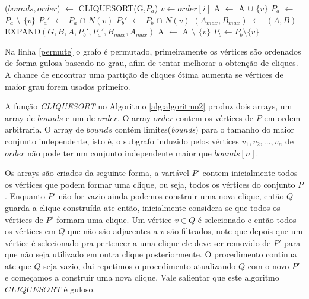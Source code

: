 \begin{algorithm}[]
\begin{algorithmic}[1]
                    \State ($bounds,order$) $\gets$ CLIQUESORT(G,$P_a$)
                            \State $v \gets order[i]$
                            \State A $\gets$ A $\cup$ $\{v\}$
                            \State $P_a$ $\gets$ $P_a$ $\setminus$ $\{v\}$
                            \State $P_a'$ $\gets$ $P_a$ $\cap$ $\overline{N(v)}$
                            \State $P_b'$ $\gets$ $P_b$ $\cap$ $N(v)$
                                \State $(A_{max}, B_{max})$ $\gets$ $(A,B)$
                            \EndIf
                                \State EXPAND$(G,B,A,P_b',P_a',B_{max},A_{max})$
                            \EndIf
                            \State A $\gets$ A $\setminus$ $\{v\}$
                                \State $P_b \gets P_b \setminus \{v\}$
                            \EndIf
                        \EndIf
                    \EndFor
                \EndFunction
                
            \end{algorithmic}
    \end{algorithm}

 Na linha \ref{permute} o grafo é permutado, primeiramente os vértices são ordenados de forma gulosa baseado no grau, afim de tentar melhorar a obtenção de cliques. A chance de encontrar uma partição de cliques ótima aumenta se vértices de maior grau forem usados primeiro.

 A função \textit{CLIQUESORT} no Algoritmo \ref{alg:algoritmo2} produz dois arrays, um array de $bounds$ e um de $order$. O array $order$ contem os vértices de $P$ em ordem arbitraria. O array de $bounds$ contém limites(\textit{bounds}) para o tamanho do maior conjunto independente, isto é, o subgrafo induzido pelos vértices $v_1,v_2,\dots,v_n$ de $order$ não pode ter um conjunto independente maior que $bounds[n]$. 
 
 Os arrays são criados da seguinte forma, a variável $P'$ contem inicialmente todos os vértices que podem formar uma clique, ou seja, todos os vértices do conjunto $P$. Enquanto $P'$ não for vazio ainda podemos construir uma nova clique, então $Q$ guarda a clique construída ate então, inicialmente considera-se que todos os vértices de $P'$ formam uma clique. Um vértice $v \in Q$ é selecionado e então todos os vértices em $Q$ que não são adjacentes a $v$ são filtrados, note que depois que um vértice é selecionado pra pertencer a uma clique ele deve ser removido de $P'$ para que não seja utilizado em outra clique posteriormente. O procedimento continua ate que $Q$ seja vazio, dai repetimos o procedimento atualizando $Q$ com o novo $P'$ e começamos a construir uma nova clique. Vale salientar que este algoritmo $CLIQUESORT$ é guloso.
 
